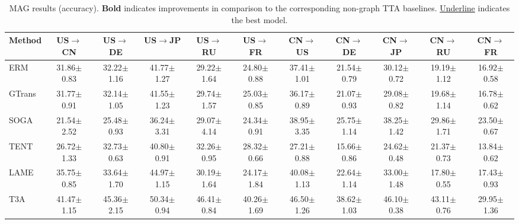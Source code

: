 
\begin{table*}[t]
\vspace{-2mm}
\scriptsize
\caption{MAG results (accuracy). \textbf{Bold} indicates improvements in comparison to the corresponding non-graph TTA baselines. \underline{Underline} indicates the best model.}
\vspace{-2mm}
\label{table:mag}
\begin{center}
\begin{adjustbox}{width = 1\textwidth}
\begin{tabular}{lcccccccccc}
\toprule
\textbf{Method} & US$\rightarrow$CN & US$\rightarrow$DE & US$\rightarrow$JP & US$\rightarrow$RU & US$\rightarrow$FR & CN$\rightarrow$US &CN$\rightarrow$DE & CN$\rightarrow$JP & CN$\rightarrow$RU & CN$\rightarrow$FR\\
\midrule
ERM &31.86$\pm$0.83 &32.22$\pm$1.16 &41.77$\pm$1.27 &29.22$\pm$1.64 &24.80$\pm$0.88 &37.41$\pm$1.01 &21.54$\pm$0.79 &30.12$\pm$0.72 &19.19$\pm$1.12 &16.92$\pm$0.58 
\\
GTrans  &31.77$\pm$0.91 &32.14$\pm$1.05 &41.55$\pm$1.23 &29.74$\pm$1.57 &25.03$\pm$0.85 &36.17$\pm$0.89 &21.07$\pm$0.93 &29.08$\pm$0.82 &19.68$\pm$1.14 &16.78$\pm$0.62  \\
SOGA &21.54$\pm$2.52 &25.48$\pm$0.93 &36.24$\pm$3.31 &29.07$\pm$4.14 &24.34$\pm$0.91 &38.95$\pm$3.35 &25.75$\pm$1.14 &38.25$\pm$1.42 &29.86$\pm$1.71 &23.50$\pm$0.67  \\
TENT &26.72$\pm$1.33 &32.73$\pm$0.63 &40.80$\pm$0.91 &32.26$\pm$0.95 &28.32$\pm$0.66 &27.21$\pm$0.88 &15.66$\pm$0.86 &24.62$\pm$0.48 &21.37$\pm$0.73 &13.84$\pm$0.62 
\\ 
LAME &35.75$\pm$0.85 &33.64$\pm$1.70 &44.97$\pm$1.15 &30.19$\pm$1.64 &24.17$\pm$1.84 &40.08$\pm$1.13 &22.64$\pm$1.14 &33.00$\pm$1.48 &17.80$\pm$0.55 &17.43$\pm$0.93 
 \\
T3A  &41.47$\pm$1.15 &45.36$\pm$2.15 &50.34$\pm$0.94 &46.41$\pm$0.84 &40.26$\pm$1.69 &46.50$\pm$1.26 &38.62$\pm$1.03 &46.10$\pm$0.38 &43.11$\pm$0.76 &29.95$\pm$1.36  
\\

\end{tabular}
\end{adjustbox}
\end{center}
\end{table*}
